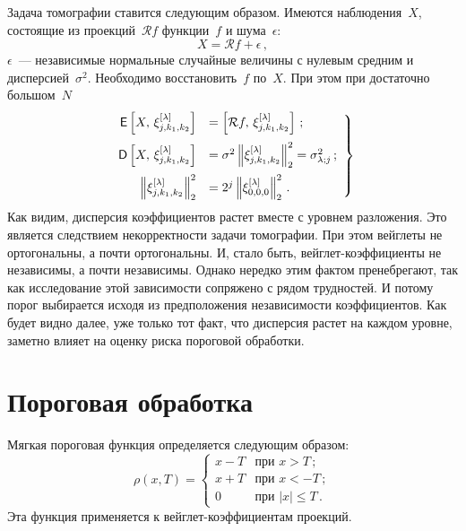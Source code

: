 \begin{multicols}{2}
Задача томографии ставится следующим образом. Имеются наблюдения~$X$, состоящие из 
проекций~$\mathcal{R}f$ функции~$f$ и шума~$\epsilon$:
\begin{equation*}%
X=\mathcal{R}f+\epsilon\,, 
\end{equation*}
$\epsilon$~--- независимые нормальные случайные величины с нулевым средним и дисперсией~$\sigma^2$. 
Необходимо восстановить~$f$ по~$X$. При этом при достаточно большом~$N$~\cite{KolaczykArticle}
\begin{equation}
\left.
\begin{array}{rl}
{\sf E} \left[X,\,\xi^{[\lambda]}_{j,k_1,k_2}\right] &= \left[\mathcal{R}f,\,\xi^{[\lambda]}_{j,k_1,k_2}\right]\,;\\[9pt]
{\sf D} \left[X,\,\xi^{[\lambda]}_{j,k_1,k_2}\right] &= \sigma^2 \left\|\xi^{[\lambda]}_{j,k_1,k_2}\right\|_2^2=\sigma^2_{\lambda;j}\,;\\[9pt]
\left\|\xi^{[\lambda]}_{j,k_1,k_2}\right\|_2^2 &= 2^j \left\|\xi^{[\lambda]}_{0,0,0}\right\|_2^2\,.
\end{array}
\right \}
\label{eq_expctVageuletteCoef}
\end{equation}
Как видим, дисперсия коэффициентов растет вмес\-те с уровнем разложения. Это является следствием 
некорректности задачи томографии. При этом вейглеты не ортогональны, а почти ортогональны. И, 
стало быть, вейг\-лет-коэф\-фи\-ци\-ен\-ты не независимы, а почти независимы. Однако нередко 
этим фактом пренебрегают, так как исследование этой зависимости сопряжено с рядом трудностей. 
И потому порог выбирается исходя из предположения независимости коэффициентов. Как будет видно 
далее, уже только тот факт, что дисперсия растет на каждом уровне, заметно влияет на оценку 
риска пороговой обработки.

\section{Пороговая обработка}\label{sect_ThreshholdingTomo}

Мягкая пороговая функция определяется следующим образом:
\begin{equation*}
\rho(x, T)=
\begin{cases}
x-T & \text{при } x>T\,;\\
x+T & \text{при } x<-T\,;\\
0 & \text{при } |x|\leq T\,.
\end{cases} 
\end{equation*}
Эта функция применяется к вейглет-ко\-эф\-фи\-ци\-ен\-там проекций.


\end{multicols}
